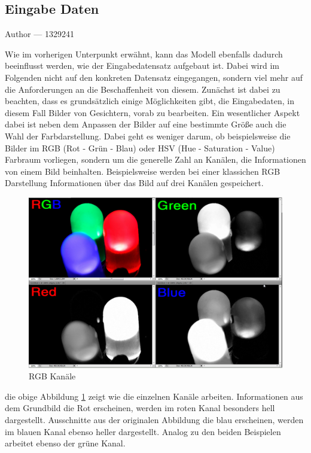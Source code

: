 \documentclass[12pt, a4paper]{report}
\makeatletter
\newcommand*\setcaptioncitation[1]{\def\captioncitation{\textit{Quelle:}~#1}}
\let\captioncitation\relax
\newcommand{\sectionauthor}[1]{%
  {\parindent0pt\vspace*{-5pt}%
  \large{Author --- }
  \linespread{1.1}\large\scshape#1%
  \par\nobreak\vspace*{35pt} }
  \@afterheading%
}
\makeatother
\begin{document}
\subsection{Eingabe Daten}
\sectionauthor{1329241}
\label{subsec: Eingabe Daten}
Wie im vorherigen Unterpunkt erwähnt, kann das Modell ebenfalls dadurch beeinflusst werden, wie der Eingabedatensatz aufgebaut ist. Dabei wird im Folgenden nicht auf den konkreten Datensatz eingegangen, sondern viel mehr auf die Anforderungen an die Beschaffenheit von diesem. Zunächst ist dabei zu beachten, dass es grundsätzlich einige Möglichkeiten gibt, die Eingabedaten, in diesem Fall Bilder von Gesichtern, vorab zu bearbeiten. Ein wesentlicher Aspekt dabei ist neben dem Anpassen der Bilder auf eine bestimmte Größe auch die Wahl der Farbdarstellung. Dabei geht es weniger darum, ob beispielsweise die Bilder im RGB (Rot - Grün - Blau) oder HSV (Hue - Saturation - Value) Farbraum vorliegen, sondern um die generelle Zahl an Kanälen, die Informationen von einem Bild beinhalten. Beispielsweise werden bei einer klassichen RGB Darstellung Informationen über das Bild auf drei Kanälen gespeichert. 
\begin{figure}[h]
\includegraphics[width=\linewidth]{Bilder/RGB.png}
\setcaptioncitation{ https://www.howtogeek.com/wp-content/uploads/2011/02/sshot-74.png}
\caption{RGB Kanäle}
\label{fig: RGB}
\end{figure}
die obige Abbildung \ref{fig: RGB} zeigt wie die einzelnen Kanäle arbeiten. Informationen aus dem Grundbild die Rot erscheinen, werden im roten Kanal besonders hell dargestellt. 
Ausschnitte aus der originalen Abbildung die blau erscheinen, werden im blauen Kanal ebenso heller dargestellt. Analog zu den beiden Beispielen arbeitet ebenso der grüne Kanal.
\end{document}
